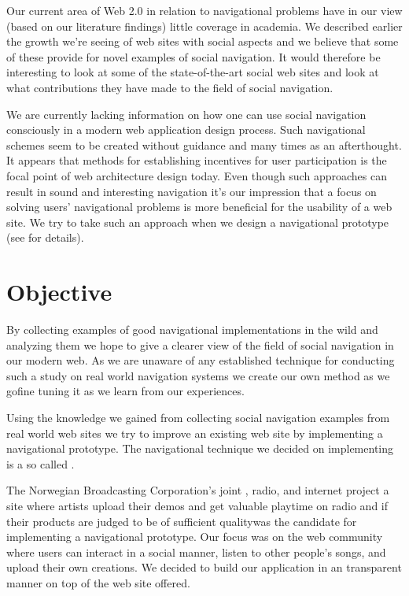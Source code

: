Our current area of Web 2.0 in relation to navigational problems have in our
view (based on our literature findings) little coverage in academia.
We described earlier the growth we're seeing of web sites with social
aspects and we believe that some of these provide for novel examples of social
navigation. It would therefore be interesting to look at some of the
state-of-the-art social web sites and look at what contributions they have
made to the field of social navigation.

We are currently lacking information on how one can use social navigation
consciously in a modern web application design process. Such navigational
schemes seem to be created without guidance and many times as an afterthought.
It appears that methods for establishing incentives for user participation
is the focal point of web architecture design today. Even though such
approaches can result in sound and interesting navigation it's our impression
that a focus on solving users' navigational problems is more beneficial for
the usability of a web site. We try to take such an approach when we design a
navigational prototype (see  for details).

\section{Objective}

By collecting examples of good navigational implementations in the wild
and analyzing them we hope to give a clearer
view of the field of social navigation in our modern web.
As we are unaware of any established technique for
conducting such a study on real world navigation systems we create our own
method as we go\dash{}fine tuning it as we learn from our experiences.

Using the knowledge we gained from collecting social navigation examples
from real world web sites we try to improve an existing web site by
implementing a navigational prototype. The navigational technique we
decided on implementing is a so called .%

The Norwegian Broadcasting Corporation's joint
, radio, and internet project \project{\urort{}}\dash{}a site where
artists upload their demos and get valuable playtime on radio and  if
their products are judged to be of sufficient quality\dash{}was
the candidate for implementing a navigational prototype.
Our focus was on the \urort{} web community%
where users can interact in a social manner, listen to other people's songs,
and upload their own creations.
We decided to build our application in an transparent manner on top of the
web site \urort{} offered.%

